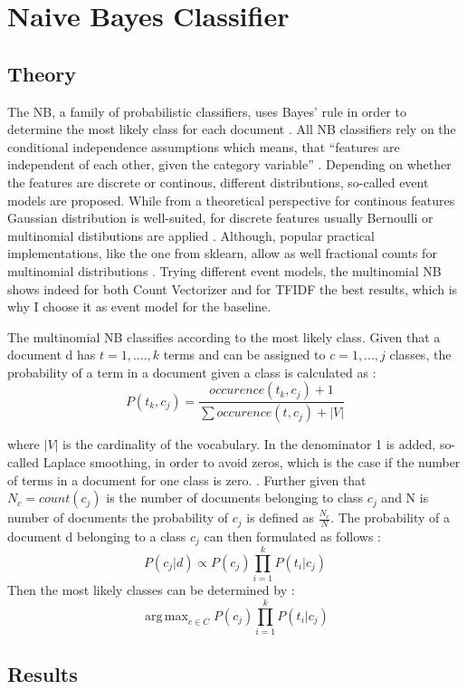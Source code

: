 \documentclass[12pt, a4paper, titlepage]{article}
\DeclareMathOperator*{\argmax}{arg\,max}
\begin{document}




\appendix
\section{Naive Bayes Classifier}
\subsection{Theory}
The \ac{NB}, a family of probabilistic classifiers, uses Bayes' rule in order to determine the most likely class for each document \citep{Schneider2005}. All \ac{NB} classifiers rely on the conditional independence assumptions which means, that ``features are independent of each other, given the category variable'' \citep[48]{Xu2018}. Depending on whether the features are discrete or continous, different distributions, so-called event models are proposed. While from a theoretical perspective for continous features Gaussian distribution is well-suited, for discrete features usually Bernoulli or multinomial distibutions are applied \citep{Xu2018}. Although, popular practical implementations, like the one from sklearn, allow as well fractional counts for multinomial distributions \citep{scikit-learn}. Trying different event models, the multinomial \ac{NB} shows indeed for both Count Vectorizer and for TFIDF the best results, which is why I choose it as event model for the baseline. 

The multinomial \ac{NB} classifies according to the most likely class. Given that a document d has $t = 1, ...., k$ terms and can be assigned to $c = 1,...,j$ classes, the probability of a term in a document given a class is calculated as \citep{Manning2008}:
\[ P(t_k, c_j) = \frac{occurence(t_k, c_j) + 1}{\sum occurence(t, c_j) + |V|} \]

where $|V|$ is the cardinality of the vocabulary. In the denominator 1 is added, so-called Laplace smoothing, in order to avoid zeros, which is the case if the number of terms in a document for one class is zero. \citep{Manning2008}. Further given that $N_c = count(c_j)$ is the number of documents belonging to class $c_j$ and N is number of documents the probability of $c_j$ is defined as $\frac{N_c}{N}$. The probability of a document d belonging to a class $c_j$ can then formulated as follows \citep[258]{Manning2008}:
\[ P(c_j|d) \propto P(c_j) \prod_{i = 1}^k P(t_i|c_j) \]
Then the most likely classes can be determined by \citep{Manning2008}: 
\[\argmax_{c \in C} P(c_j) \prod_{i = 1}^k P(t_i|c_j) \] 

\subsection{Results}
\end{document}
